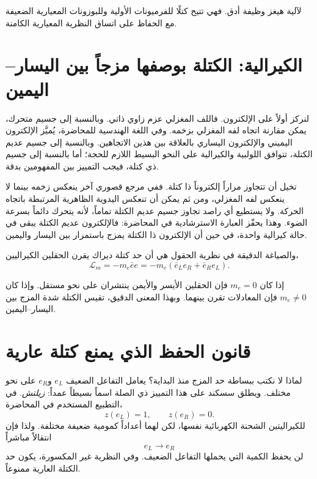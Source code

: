 لآلية هيغز وظيفة أدق. فهي تتيح كتلًا للفرميونات الأولية وللبوزونات المعيارية الضعيفة مع الحفاظ على اتساق النظرية المعيارية الكامنة.

\section{الكيرالية: الكتلة بوصفها مزجاً بين اليسار--اليمين}

لنركز أولاً على الإلكترون. فاللف المغزلي عزم زاوي ذاتي. وبالنسبة إلى جسيم متحرك، يمكن مقارنة اتجاه لفه المغزلي بزخمه. وفي اللغة الهندسية للمحاضرة، يُميَّز الإلكترون اليميني والإلكترون اليساري بالعلاقة بين هذين الاتجاهين. وبالنسبة إلى جسيم عديم الكتلة، تتوافق اللولبية والكيرالية على النحو البسيط اللازم للحجة؛ أما بالنسبة إلى جسيم ذي كتلة، فيجب التمييز بين المفهومين بدقة.

تخيل أن تتجاوز مراراً إلكتروناً ذا كتلة. ففي مرجع قصوري آخر ينعكس زخمه بينما لا ينعكس لفه المغزلي، ومن ثم يمكن أن تنعكس اليدوية الظاهرية المرتبطة باتجاه الحركة. ولا يستطيع أي راصد تجاوز جسيم عديم الكتلة تماماً، لأنه يتحرك دائماً بسرعة الضوء. وهذا يحفّز العبارة الاسترشادية في المحاضرة: فالإلكترون عديم الكتلة يبقى في حالة كيرالية واحدة، في حين أن الإلكترون ذا الكتلة يمزج باستمرار بين اليسار واليمين.

والصياغة الدقيقة في نظرية الحقول هي أن حد كتلة ديراك يقرن الحقلين الكيراليين،
\begin{equation}
\mathcal L_m
=
-m_e\bar e e
=
-m_e
\left(
  \bar e_L e_R
  +
  \bar e_R e_L
\right).
\end{equation}

إذا كان $m_e=0$ فإن الحقلين الأيسر والأيمن ينتشران على نحو مستقل. وإذا كان $m_e\ne0$ فإن المعادلات تقرن بينهما. وبهذا المعنى الدقيق، تقيس الكتلة شدة المزج بين اليسار--اليمين.

\section{قانون الحفظ الذي يمنع كتلة عارية}

لماذا لا نكتب ببساطة حد المزج منذ البداية؟ يعامل التفاعل الضعيف $e_L$ و$e_R$ على نحو مختلف. ويطلق سسكند على هذا التمييز ذي الصلة اسماً بسيطاً عمداً: \emph{زيلتش}. في التطبيع المستخدم في المحاضرة،
\begin{equation}
z(e_L)=1,
\qquad
z(e_R)=0.
\end{equation}
للكيراليتين الشحنة الكهربائية نفسها، لكن لهما أعداداً كمومية ضعيفة مختلفة. ولذا فإن انتقالاً مباشراً
\begin{equation}
e_L\longrightarrow e_R
\end{equation}
لن يحفظ الكمية التي يحملها التفاعل الضعيف. وفي النظرية غير المكسورة، يكون حد الكتلة العارية ممنوعاً.


